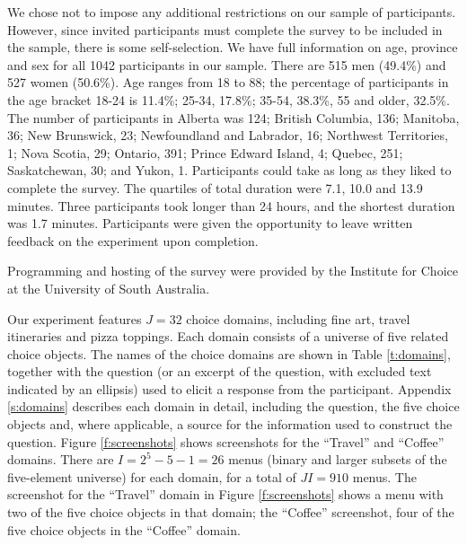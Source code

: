 \documentclass[11pt,letter]{article}
\newcommand{\menus}{menus}
\begin{document}
We chose not to impose any additional restrictions on our sample of participants.
However, since invited participants must complete the survey to be included in the sample, there is some self-selection.
We have full information on age, province and sex for all 1042 participants in our sample.
There are 515 men (49.4\%) and 527 women (50.6\%).
Age ranges from 18 to 88; the percentage of participants in the age bracket 18-24 is 11.4\%; 25-34, 17.8\%; 35-54, 38.3\%, 55 and older, 32.5\%.
The number of participants in Alberta was 124; British Columbia, 136; Manitoba, 36; New Brunswick, 23; Newfoundland and Labrador, 16; Northwest Territories, 1; Nova Scotia, 29; Ontario, 391; Prince Edward Island, 4; Quebec, 251; Saskatchewan, 30; and Yukon, 1.
Participants could take as long as they liked to complete the survey.
The quartiles of total duration were 7.1, 10.0 and 13.9 minutes.
Three participants took longer than 24 hours, and the shortest duration was 1.7 minutes.
Participants were given the opportunity to leave written feedback on the experiment upon completion.

Programming and hosting of the survey were provided by the Institute for Choice at the University of South Australia.

Our experiment features $J=32$ choice domains, including fine art, travel itineraries and pizza toppings.
Each domain consists of a universe of five related choice objects.
The names of the choice domains are shown in Table \ref{t:domains}, together with the question (or an excerpt of the question, with excluded text indicated by an ellipsis) used to elicit a response from the participant.
Appendix \ref{s:domains} describes each domain in detail, including the question, the five choice objects and, where applicable, a source for the information used to construct the question.
Figure \ref{f:screenshots} shows screenshots for the ``Travel'' and ``Coffee'' domains.
There are $I=2^{5}-5-1=26$ \menus{} (binary and larger subsets of the five-element universe) for each domain, for a total of $JI=910$ \menus{}.
The screenshot for the ``Travel'' domain in Figure \ref{f:screenshots} shows a menu with two of the five choice objects in that domain; the ``Coffee'' screenshot, four of the five choice objects in the ``Coffee'' domain.
\end{document}
